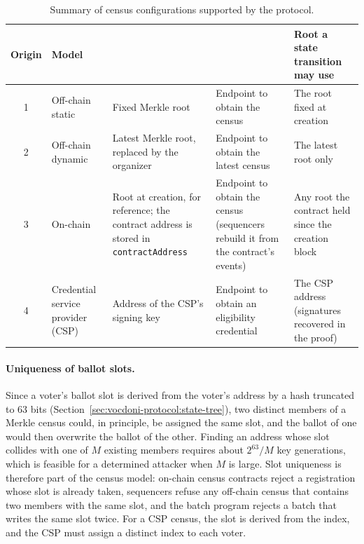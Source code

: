 \begin{table}[H]
	\centering
	\caption{Summary of census configurations supported by the \davinci protocol.}
	\label{tab:census-models}
	\small
	\begin{tabular}{c >{\raggedright\arraybackslash}p{} >{\raggedright\arraybackslash}p{} >{\raggedright\arraybackslash}p{} >{\raggedright\arraybackslash}p{}}
		\toprule
		\textbf{Origin} & \textbf{Model} & \textbf{\censusroot} & \textbf{\censusuri} & \textbf{Root a state transition may use} \\
		\midrule
		1 & Off-chain static & Fixed Merkle root & Endpoint to obtain the census & The root fixed at creation \\
		2 & Off-chain dynamic & Latest Merkle root, replaced by the organizer & Endpoint to obtain the latest census & The latest root only \\
		3 & On-chain & Root at creation, for reference; the contract address is stored in \texttt{contractAddress} & Endpoint to obtain the census (sequencers rebuild it from the contract's events) & Any root the contract held since the creation block \\
		4 & Credential service provider (\ac{CSP}) & Address of the \ac{CSP}'s signing key & Endpoint to obtain an eligibility credential & The \ac{CSP} address (signatures recovered in the proof) \\
		\bottomrule
	\end{tabular}
\end{table}

\paragraph{Uniqueness of ballot slots.} Since a voter's ballot slot is derived from the voter's address by a hash truncated to 63 bits (Section~\ref{sec:vocdoni-protocol:state-tree}), two distinct members of a Merkle census could, in principle, be assigned the same slot, and the ballot of one would then overwrite the ballot of the other. Finding an address whose slot collides with one of $M$ existing members requires about $2^{63}/M$ key generations, which is feasible for a determined attacker when $M$ is large. Slot uniqueness is therefore part of the census model: on-chain census contracts reject a registration whose slot is already taken, sequencers refuse any off-chain census that contains two members with the same slot, and the batch program rejects a batch that writes the same slot twice. For a \ac{CSP} census, the slot is derived from the index, and the \ac{CSP} must assign a distinct index to each voter.
